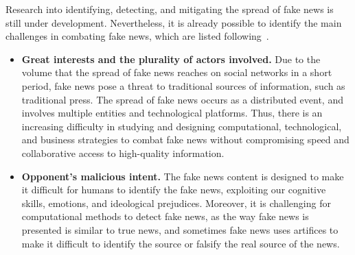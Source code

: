 \documentclass{ieeeaccess}
\begin{document}
Research into identifying, detecting, and mitigating the spread of fake news is still under development. Nevertheless, it is already possible to identify the main challenges in combating fake news, which are listed following~\cite{sharma2019combating}.


\begin{itemize}

\item{\bf Great interests and the plurality of actors involved.} Due to the volume that the spread of fake news reaches on social networks in a short period, fake news pose a threat to traditional sources of information, such as traditional press. The spread of fake news occurs as a distributed event, and involves multiple entities and technological platforms. Thus, there is an increasing difficulty in studying and designing computational, technological, and business strategies to combat fake news without compromising speed and collaborative access to high-quality information.


\item{\bf Opponent's malicious intent.} The fake news content is designed to make it difficult for humans to identify the fake news, exploiting our cognitive skills, emotions, and ideological prejudices. Moreover, it is challenging for computational methods to detect fake news, as the way fake news is presented is similar to true news, and sometimes fake news uses artifices to make it difficult to identify the source or falsify the real source of the news.


\end{itemize}
\end{document}
